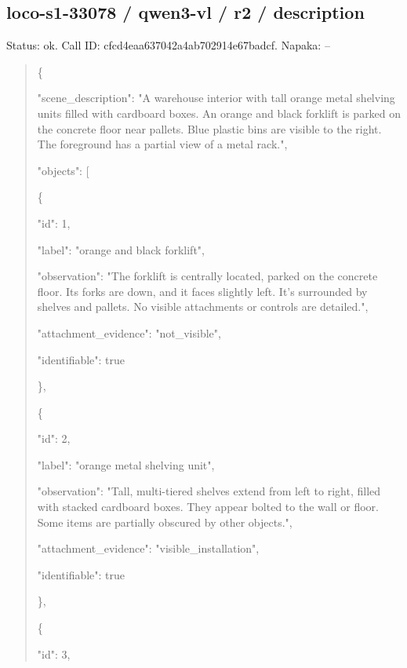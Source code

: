 \documentclass[10pt,a4paper]{article}
\begin{document}
\subsection*{loco-s1-33078 / qwen3-vl / r2 / description}
Status: ok. Call ID: cfcd4eaa637042a4ab702914e67badcf. Napaka: --
\begin{quote}\footnotesize
\{\par
  "scene\_description":\allowbreak{} "A warehouse interior with tall orange metal shelving units filled with cardboard boxes. An orange and black forklift is parked on the concrete floor near pallets. Blue plastic bins are visible to the right. The foreground has a partial view of a metal rack.",\allowbreak{}\par
  "objects":\allowbreak{} [\par
    \{\par
      "id":\allowbreak{} 1,\allowbreak{}\par
      "label":\allowbreak{} "orange and black forklift",\allowbreak{}\par
      "observation":\allowbreak{} "The forklift is centrally located,\allowbreak{} parked on the concrete floor. Its forks are down,\allowbreak{} and it faces slightly left. It's surrounded by shelves and pallets. No visible attachments or controls are detailed.",\allowbreak{}\par
      "attachment\_evidence":\allowbreak{} "not\_visible",\allowbreak{}\par
      "identifiable":\allowbreak{} true\par
    \},\allowbreak{}\par
    \{\par
      "id":\allowbreak{} 2,\allowbreak{}\par
      "label":\allowbreak{} "orange metal shelving unit",\allowbreak{}\par
      "observation":\allowbreak{} "Tall,\allowbreak{} multi-tiered shelves extend from left to right,\allowbreak{} filled with stacked cardboard boxes. They appear bolted to the wall or floor. Some items are partially obscured by other objects.",\allowbreak{}\par
      "attachment\_evidence":\allowbreak{} "visible\_installation",\allowbreak{}\par
      "identifiable":\allowbreak{} true\par
    \},\allowbreak{}\par
    \{\par
      "id":\allowbreak{} 3,\allowbreak{}\par

\end{quote}
\end{document}
